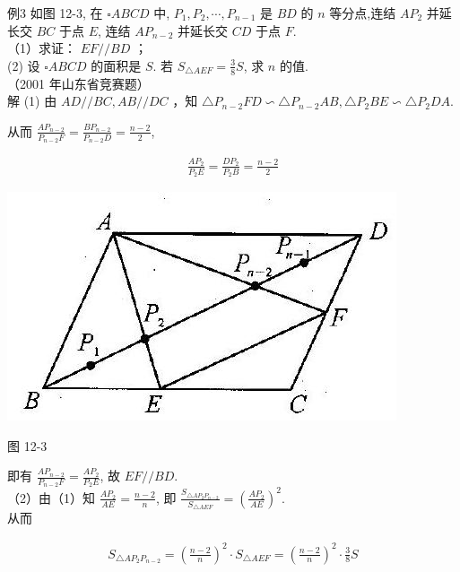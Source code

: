 \documentclass[10pt]{article}
\begin{document}
例3 如图 12-3, 在 $\square A B C D$ 中, $P_{1}, P_{2}, \cdots, P_{n-1}$ 是 $B D$ 的 $n$ 等分点,连结 $A P_{2}$ 并延长交 $B C$ 于点 $E$, 连结 $A P_{n-2}$ 并延长交 $C D$ 于点 $F$.\\
（1）求证： $E F / / B D$ ；\\
(2) 设 $\square A B C D$ 的面积是 $S$. 若 $S_{\triangle A E F}=\frac{3}{8} S$, 求 $n$ 的值.\\
（2001 年山东省竞赛题）\\
解 (1) 由 $A D / / B C, A B / / D C$ ，知 $\triangle P_{n-2} F D \backsim \triangle P_{n-2} A B, \triangle P_{2} B E \backsim \triangle P_{2} D A$.

从而 $\frac{A P_{n-2}}{P_{n-2} F}=\frac{B P_{n-2}}{P_{n-2} D}=\frac{n-2}{2}$,

\begin{align*}
\frac{A P_{2}}{P_{2} E}=\frac{D P_{2}}{P_{2} B}=\frac{n-2}{2}
\end{align*}

\begin{center}
\includegraphics[max width=\textwidth]{2024_10_30_2c8f45efd4a519b08e1ag-111}
\end{center}

图 12-3

即有 $\frac{A P_{n-2}}{P_{n-2} F}=\frac{A P_{2}}{P_{2} E}$, 故 $E F / / B D$.\\
（2）由（1）知 $\frac{A P_{2}}{A E}=\frac{n-2}{n}$, 即 $\frac{S_{\triangle A P_{2} P_{n-2}}}{S_{\triangle A E F}}=\left(\frac{A P_{2}}{A E}\right)^{2}$.\\
从而

\begin{align*}
S_{\triangle A P_{2} P_{n-2}}=\left(\frac{n-2}{n}\right)^{2} \cdot S_{\triangle A E F}=\left(\frac{n-2}{n}\right)^{2} \cdot \frac{3}{8} S \tag{1}
\end{align*}
\end{document}
